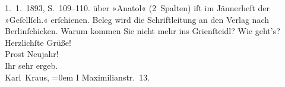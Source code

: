 \begin{ledgroupsized}[t]{13cm}
{{{                                1. 1. 1893, S. 109–110.}}}\label{K_L00150_1h}
                    über »Anatol« (2 Spalten) iſt im Jännerheft
                    der »Geſellſch.« erſchienen. Beleg wird die
                    Schriftleitung an den Verlag nach
                        Berlinſchicken. Warum kommen Sie nicht
                    mehr ins Grienſteidl? Wie geht’s?\pend
           \pstart
           Herzlichſte Grüße!{\\[\baselineskip]}Prost Neujahr!{\\[\baselineskip]}Ihr sehr ergeb.{\\[\baselineskip]}\spacefill\mbox{Karl
                        Kraus,}\pend
           \leftskip=0em{}\pstart
           \noindent{}I Maximilianstr. 13.\pend
           \endnumbering{}\end{ledgroupsized}  \newcommand{\dateiname}{L00150}\newcommand{\titel}{Karl Kraus an Arthur Schnitzler, 31. 12. 1892}\newcommand{\editorInnen}{Martin Anton Müller und Gerd-Hermann Susen}
      